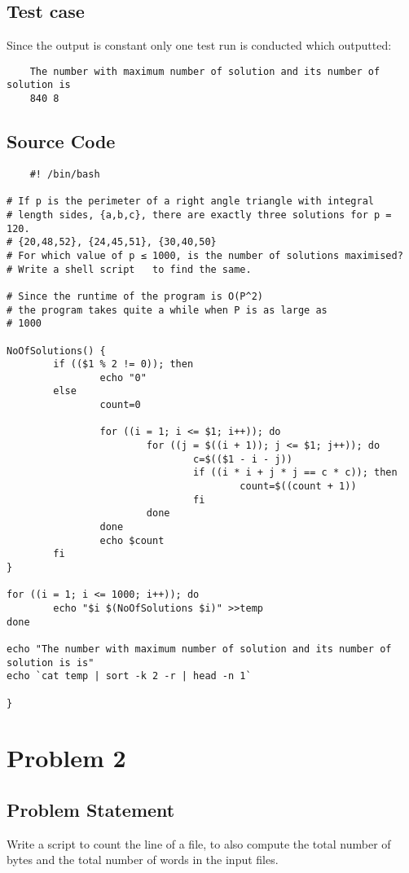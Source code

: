 \documentclass{article}
\begin{document}
\subsection{Test case}
Since the output is constant only one test run is conducted which outputted:
\begin{verbatim}
    The number with maximum number of solution and its number of solution is 
    840 8
\end{verbatim}


\subsection{Source Code}
\begin{verbatim}
    #! /bin/bash

# If p is the perimeter of a right angle triangle with integral 
# length sides, {a,b,c}, there are exactly three solutions for p = 120.  
# {20,48,52}, {24,45,51}, {30,40,50} 
# For which value of p ≤ 1000, is the number of solutions maximised? 
# Write a shell script   to find the same.

# Since the runtime of the program is O(P^2)
# the program takes quite a while when P is as large as
# 1000

NoOfSolutions() {
        if (($1 % 2 != 0)); then
                echo "0"
        else
                count=0

                for ((i = 1; i <= $1; i++)); do
                        for ((j = $((i + 1)); j <= $1; j++)); do
                                c=$(($1 - i - j))
                                if ((i * i + j * j == c * c)); then
                                        count=$((count + 1))
                                fi
                        done
                done
                echo $count
        fi
}

for ((i = 1; i <= 1000; i++)); do
        echo "$i $(NoOfSolutions $i)" >>temp
done

echo "The number with maximum number of solution and its number of solution is is"
echo `cat temp | sort -k 2 -r | head -n 1`

}
\end{verbatim}

\newpage
\section{Problem 2}
\subsection{Problem Statement}
Write a script to count the line of a file, to also compute the total number of bytes and the total number of words in the input files.
\end{document}
